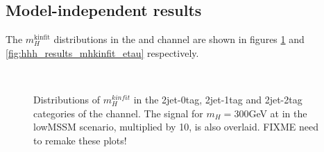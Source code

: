 \subsection{Model-independent results}
\label{sec:hhh_results_modelindep}

The $m_{H}^{\text{kinfit}}$ distributions in the \mutau and \etau channel 
are shown in figures \ref{fig:hhh_results_mhkinfit_mutau} and \ref{fig:hhh_results_mhkinfit_etau} 
respectively.

\begin{figure}[h!]
\begin{center}
~\\
\end{center}
\caption{Distributions of $m_{H}^{kinfit}$ in the 2jet-0tag, 2jet-1tag and 2jet-2tag categories 
of the \mutau channel. The \Htohhtobbtautau signal for $m_{H} = 300 $GeV at  in the low\tanb MSSM
scenario, multiplied by 10, is also overlaid. FIXME need to remake these plots!}
\label{fig:hhh_results_mhkinfit_mutau}
\end{figure}

